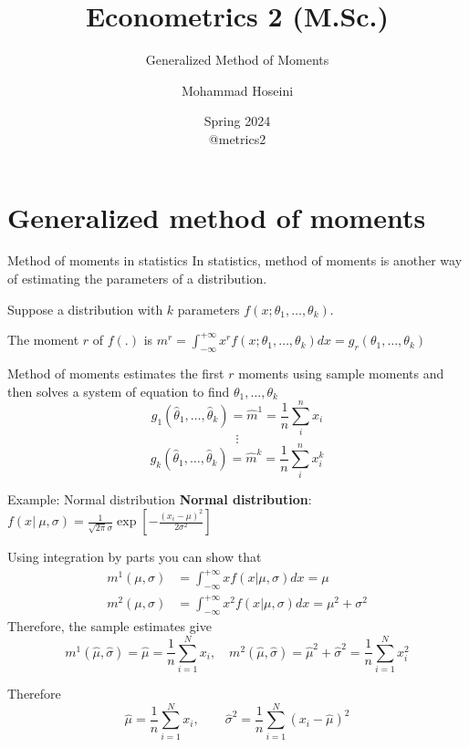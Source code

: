 \documentclass[handout]{beamer}
\begin{document}
	\title[Econometrics 2]{Econometrics 2 (M.Sc.)}
	\subtitle{Generalized Method of Moments}
	\author[Mohammad Hoseini]{Mohammad Hoseini}
	
	
	\date[Spring 2024]{Spring 2024 \\
	\vspace{10pt} @metrics2
}

	
\begin{frame}[plain]
	\titlepage
\end{frame}

\section{Generalized method of moments}

\begin{frame}{Method of moments in statistics}
In statistics, method of moments is another way of estimating the parameters of a distribution.\bigskip

Suppose a distribution with $k$ parameters $f(x;\theta_1,\dots,\theta_k)$. \medskip

The moment $r$ of $f(.)$ is $m^r=\int_{-\infty}^{+\infty} x^rf(x;\theta_1,\dots,\theta_k)dx=g_r(\theta_1,\dots,\theta_k)$\bigskip

Method of moments estimates the first $r$ moments using sample moments and then solves a system of equation to find $\theta_1,\dots,\theta_k$
\[g_1(\hat{\theta}_1,\dots,\hat{\theta}_k)=\hat{m}^1=\frac{1}{n}\sum_i^n x_i \]
\[\vdots \]
\[g_k(\hat{\theta}_1,\dots,\hat{\theta}_k)=\hat{m}^k=\frac{1}{n}\sum_i^n x_i^k \]
\end{frame}


\begin{frame}{Example: Normal distribution}
\textbf{Normal distribution}: $f(x|\ \mu,\sigma)=\frac{1}{\sqrt{2\pi}\sigma}\exp[-\frac{(x_i-\mu)^2}{2\sigma^2}] $

Using integration by parts you can show that
\begin{align*}
m^1(\mu,\sigma)&=\int_{-\infty}^{+\infty} xf(x|\mu,\sigma)dx=\mu\\
m^2(\mu,\sigma)&=\int_{-\infty}^{+\infty} x^2f(x|\mu,\sigma)dx=\mu^2+\sigma^2
\end{align*}
Therefore, the sample estimates give \[ m^1(\hat{\mu}, \hat{\sigma})=\hat{\mu}=\frac{1}{n}\sum_{i=1}^N x_i, \quad m^2(\hat{\mu}, \hat{\sigma})=\hat{\mu}^2+\hat{\sigma}^2=\frac{1}{n}\sum_{i=1}^N x_i^2 \] 

Therefore
\[\hat{\mu}=\frac{1}{n}\sum_{i=1}^N x_i, \qquad \hat{\sigma}^2= \frac{1}{n}\sum_{i=1}^N (x_i-\hat{\mu})^2 \]

\end{frame}
\end{document}
